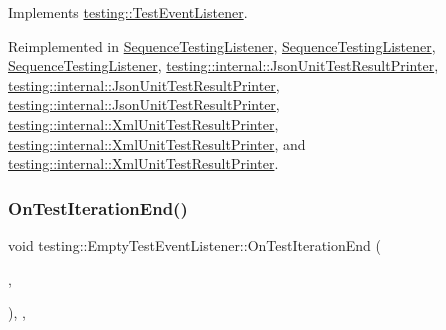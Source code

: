 Implements \mbox{\hyperlink{classtesting_1_1_test_event_listener_a550fdb3e55726e4cefa09f5697941425}{testing\+::\+Test\+Event\+Listener}}.



Reimplemented in \mbox{\hyperlink{class_sequence_testing_listener_a783bc01e2a95f5bf73bbde4d96832e0f}{Sequence\+Testing\+Listener}}, \mbox{\hyperlink{class_sequence_testing_listener_ae3a4e15e6c811a7b70992669d659e11e}{Sequence\+Testing\+Listener}}, \mbox{\hyperlink{class_sequence_testing_listener_ae3a4e15e6c811a7b70992669d659e11e}{Sequence\+Testing\+Listener}}, \mbox{\hyperlink{classtesting_1_1internal_1_1_json_unit_test_result_printer_a9716a1dd5a3608181748c1b6f039c365}{testing\+::internal\+::\+Json\+Unit\+Test\+Result\+Printer}}, \mbox{\hyperlink{classtesting_1_1internal_1_1_json_unit_test_result_printer_a9716a1dd5a3608181748c1b6f039c365}{testing\+::internal\+::\+Json\+Unit\+Test\+Result\+Printer}}, \mbox{\hyperlink{classtesting_1_1internal_1_1_json_unit_test_result_printer_a937dff300da12370b9dd0a0dd82a529a}{testing\+::internal\+::\+Json\+Unit\+Test\+Result\+Printer}}, \mbox{\hyperlink{classtesting_1_1internal_1_1_xml_unit_test_result_printer_abf972ca903d66d5ea52d9b1bc0a27f21}{testing\+::internal\+::\+Xml\+Unit\+Test\+Result\+Printer}}, \mbox{\hyperlink{classtesting_1_1internal_1_1_xml_unit_test_result_printer_abf972ca903d66d5ea52d9b1bc0a27f21}{testing\+::internal\+::\+Xml\+Unit\+Test\+Result\+Printer}}, and \mbox{\hyperlink{classtesting_1_1internal_1_1_xml_unit_test_result_printer_a37cf92d3953b2be56f9fcb049a68846c}{testing\+::internal\+::\+Xml\+Unit\+Test\+Result\+Printer}}.

\mbox{\label{classtesting_1_1_empty_test_event_listener_aae9c5c61e476f0c421402fb1dde434d2}} 
\subsubsection{\texorpdfstring{OnTestIterationEnd()}{OnTestIterationEnd()}\hspace{0.1cm}{\footnotesize\ttfamily [3/3]}}
{\footnotesize\ttfamily void testing\+::\+Empty\+Test\+Event\+Listener\+::\+On\+Test\+Iteration\+End (\begin{DoxyParamCaption}\item[{const \mbox{\hyperlink{classtesting_1_1_unit_test}{Unit\+Test}} \&}]{,  }\item[{int}]{ }\end{DoxyParamCaption})\hspace{0.3cm}{\ttfamily [inline]}, {\ttfamily [override]}, {\ttfamily [virtual]}}



